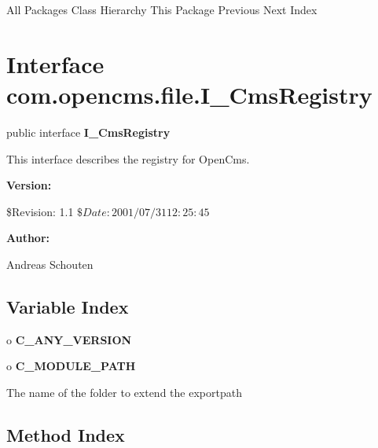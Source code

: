 \begin{PRE}
All Packages  Class Hierarchy  This Package  Previous  Next  Index
\end{PRE}

\htmlHR

\section{  Interface com.opencms.file.I\_CmsRegistry }

\begin{description}
\item public interface {\bf I\_CmsRegistry} 
\end{description}

This interface describes the registry for OpenCms. 

\begin{description}
\item {\bf Version:}  

\$Revision: 1.1 $ \$Date: 2001/07/31 12:25:45 $  
\item {\bf Author:}  

Andreas Schouten 
\end{description}

\htmlHR

\subsection*{  Variable Index }

\begin{description}
\item o {\bf C\_ANY\_VERSION}  

\item o {\bf C\_MODULE\_PATH}  

The name of the folder to extend the exportpath 
\end{description}

\subsection*{  Method Index }

